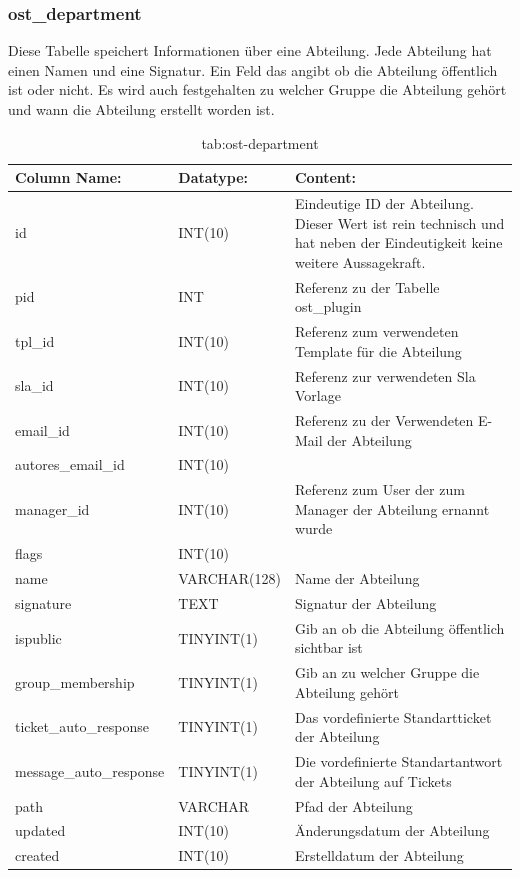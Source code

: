 \subsubsection{ost\_department}

Diese Tabelle speichert Informationen über eine Abteilung. Jede Abteilung hat einen Namen und eine Signatur. Ein Feld das angibt ob die Abteilung öffentlich ist oder nicht. Es wird auch festgehalten zu welcher Gruppe die Abteilung gehört und wann die Abteilung erstellt worden ist.

\begin{table}[h]
	\begin{tabular}{|p{3cm}|p{4cm}|p{7.7cm}|}
		\hline
		\textbf{Column Name:} & \textbf{Datatype:} & \textbf{Content:}\\
		\hline
		id & INT(10) & Eindeutige ID der Abteilung. Dieser Wert ist rein technisch und hat  neben der Eindeutigkeit keine weitere 
		Aussagekraft.\\
		\hline
		pid & INT & Referenz zu der Tabelle ost\_plugin \\
		\hline
		tpl\_id & INT(10) & Referenz zum verwendeten Template für die Abteilung\\
		\hline
		sla\_id & INT(10) & Referenz zur verwendeten Sla Vorlage\\
		\hline
		email\_id & INT(10) & Referenz zu der Verwendeten E-Mail der Abteilung\\
		\hline
		autores\_email\_id & INT(10) & \\
		\hline
		manager\_id & INT(10) & Referenz zum User der zum Manager der Abteilung ernannt wurde\\
		\hline
		flags & INT(10) & \\
		\hline
		name & VARCHAR(128) & Name der Abteilung \\
		\hline
		signature & TEXT & Signatur der Abteilung \\
		\hline
		ispublic & TINYINT(1) & Gib an ob die Abteilung öffentlich sichtbar ist \\
		\hline
		group\_membership & TINYINT(1) & Gib an zu welcher Gruppe die Abteilung gehört \\
		\hline
		ticket\_auto\_response & TINYINT(1) & Das vordefinierte Standartticket der Abteilung \\
		\hline
		message\_auto\_response & TINYINT(1) & Die vordefinierte Standartantwort der Abteilung auf Tickets \\
		\hline
		path & VARCHAR & Pfad der Abteilung\\
		\hline
		updated & INT(10) & Änderungsdatum der Abteilung\\
		\hline
		created & INT(10) & Erstelldatum der Abteilung\\
		\hline
	\end{tabular}
	\caption{tab:ost-department}
\end{table}
\label{tab:ost_department}


